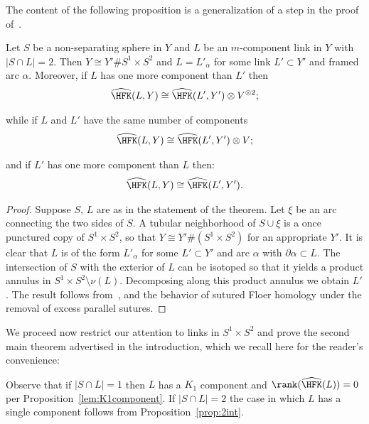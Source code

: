 \documentclass{amsart}
\theoremstyle{definition}
\theoremstyle{remark}
\numberwithin{equation}{section}
\begin{document}
The content of the following proposition is a generalization of a step in the proof of~\cite[Theorem 2.1]{Wangsplitcharp}.
\begin{proposition}
      Let $S$ be a non-separating sphere in $Y$ and $L$ be an $m$-component link in $Y$ with $|S\cap L|=2$. Then $Y\cong Y'\#S^1\times S^2$ and $L=L'_{\alpha}$ for some link $L'\subset Y'$ and framed arc $\alpha$. Moreover, if $L$ has one more component than $L'$ then
      \begin{align*}
          \widehat{\HFK}(L,Y)\cong\widehat{\HFK}(L',Y')\otimes V^{\otimes 2};\end{align*}

       \noindent  while  if $L$ and $L'$ have the same number of components  \begin{align*}
          \widehat{\HFK}(L,Y)\cong\widehat{\HFK}(L',Y')\otimes V;\end{align*}
          
        \noindent  and if $L'$ has one more component than $L$ then:\begin{align*}
          \widehat{\HFK}(L,Y)\cong\widehat{\HFK}(L',Y').\end{align*}
\end{proposition}

\begin{proof}
    Suppose $S$, $L$ are as in the statement of the theorem. Let $\xi$ be an arc connecting the two sides of $S$. A tubular neighborhood of $S\cup\xi$ is a once punctured copy of $S^1\times S^2$, so that $Y\cong Y'\#(S^1\times S^2)$ for an appropriate $Y'$. It is clear that $L$ is of the form $L'_\alpha$ for some $L'\subset Y'$ and arc $\alpha$ with $\partial\alpha\subset L$. The intersection of $S$ with the exterior of $L$ can be isotoped so that it yields a product annulus in $S^1\times S^2\setminus \nu(L)$. Decomposing along this product annulus we obtain $L'$. The result follows from~\cite[Theorem 1.3]{juhasz2008floer}, and the behavior of sutured Floer homology under the removal of excess parallel sutures.
\end{proof}

We proceed now restrict our attention to links in $S^1\times S^2$ and prove the second main theorem advertised in the introduction, which we recall here for the reader's convenience:

    \sphericalbraiddetection



Observe that if $|S\cap L|=1$ then $L$ has a $K_1$ component and $\rank(\widehat{\HFK}(L))=0$ per Proposition~\ref{lem:K1component}.  If $|S\cap L|=2$ the case in which $L$ has a single component follows from Proposition~\ref{prop:2int}.
\end{document}
